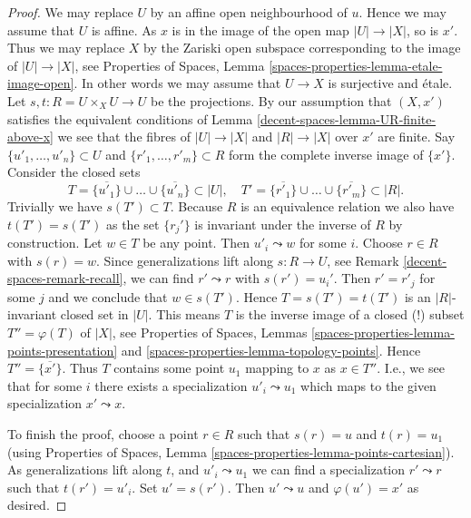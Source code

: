 \begin{proof}
We may replace $U$ by an affine open neighbourhood of $u$.
Hence we may assume that $U$ is affine. As $x$ is in the
image of the open map $|U| \to |X|$, so is $x'$. Thus we may
replace $X$ by the Zariski open subspace corresponding to
the image of $|U| \to |X|$, see
Properties of Spaces,
Lemma \ref{spaces-properties-lemma-etale-image-open}.
In other words we may assume that
$U \to X$ is surjective and \'etale.
Let $s, t : R = U \times_X U \to U$ be the projections.
By our assumption that $(X, x')$ satisfies the equivalent conditions of
Lemma \ref{decent-spaces-lemma-UR-finite-above-x}
we see that the fibres of $|U| \to |X|$ and $|R| \to |X|$
over $x'$ are finite. Say $\{u'_1, \ldots, u'_n\} \subset U$ and
$\{r'_1, \ldots, r'_m\} \subset R$ form the complete inverse image
of $\{x'\}$.
Consider the closed sets
$$
T = \overline{\{u'_1\}} \cup \ldots \cup \overline{\{u'_n\}} \subset |U|,
\quad
T' = \overline{\{r'_1\}} \cup \ldots \cup \overline{\{r'_m\}} \subset |R|.
$$
Trivially we have $s(T') \subset T$. Because $R$ is an equivalence
relation we also have $t(T') = s(T')$ as the set $\{r_j'\}$
is invariant under the inverse of $R$ by construction. Let $w \in T$
be any point. Then $u'_i \leadsto w$ for some $i$. Choose $r \in R$
with $s(r) = w$. Since generalizations lift along $s : R \to U$, see
Remark \ref{decent-spaces-remark-recall}, we can find $r' \leadsto r$ with
$s(r') = u_i'$. Then $r' = r'_j$ for some $j$ and we conclude that
$w \in s(T')$. Hence $T = s(T') = t(T')$ is an $|R|$-invariant closed
set in $|U|$. This means $T$ is the inverse image of a closed (!)
subset $T'' = \varphi(T)$ of $|X|$, see
Properties of Spaces,
Lemmas \ref{spaces-properties-lemma-points-presentation} and
\ref{spaces-properties-lemma-topology-points}.
Hence $T'' = \overline{\{x'\}}$.
Thus $T$ contains some point $u_1$ mapping to $x$ as $x \in T''$.
I.e., we see that for some $i$ there exists a specialization
$u'_i \leadsto u_1$ which maps to the given specialization
$x' \leadsto x$.

\medskip\noindent
To finish the proof, choose a point $r \in R$ such that
$s(r) = u$ and $t(r) = u_1$ (using
Properties of Spaces,
Lemma \ref{spaces-properties-lemma-points-cartesian}).
As generalizations lift along $t$, and $u'_i \leadsto u_1$
we can find a specialization $r' \leadsto r$ such that $t(r') = u'_i$.
Set $u' = s(r')$. Then $u' \leadsto u$ and $\varphi(u') = x'$ as
desired.
\end{proof}

